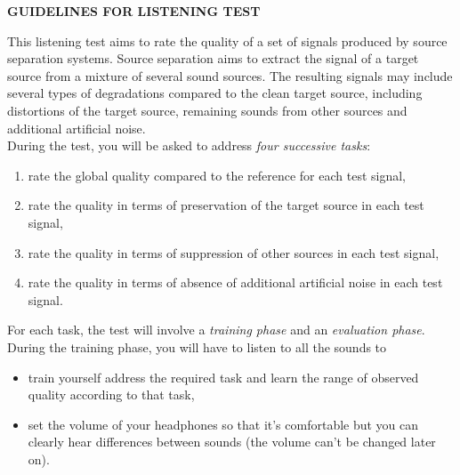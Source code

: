 \documentclass[a4paper,12pt]{article}
\begin{document}
\begin{center}
\textbf{GUIDELINES FOR LISTENING TEST\\[1em]}
\end{center}
\vspace{1.5em}
This listening test aims to rate the quality of a set of signals produced by source separation systems. Source separation aims to extract the signal of a target source from a mixture of several sound sources. The resulting signals may include several types of degradations compared to the clean target source, including distortions of the target source, remaining sounds from other sources and additional artificial noise.\\

\noindent During the test, you will be asked to address \emph{four successive tasks}:
\begin{enumerate}
\item rate the global quality compared to the reference for each test signal,
\item rate the quality in terms of preservation of the target source in each test signal,
\item rate the quality in terms of suppression of other sources in each test signal,
\item rate the quality in terms of absence of additional artificial noise in each test signal.\\
\end{enumerate}

\noindent For each task, the test will involve a \emph{training phase} and an \emph{evaluation phase}.\\

\noindent During the training phase, you will have to listen to all the sounds to
\begin{itemize}
\item train yourself address the required task and learn the range of observed quality according to that task,
\item set the volume of your headphones so that it's comfortable but you can clearly hear differences between sounds (the volume can't be changed later on).\\
\end{itemize}
\end{document}
